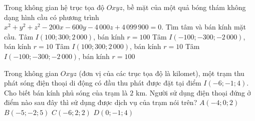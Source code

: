 \begin{ex}%
	Trong không gian hệ trục tọa độ  $Oxyz$, bề mặt của một quả bóng thám không dạng hình cầu có phương trình $x^2+y^2+z^2-200x-600y-4\,000z+4\,099\,900=0$. Tìm tâm và bán kính mặt cầu.
	 \choice
		{Tâm $I\left(100;300;2\,000\right)$, bán  kính $r=100$}
		{Tâm $I\left(-100;-300;-2\,000\right)$, bán  kính $r=10$}
		{\True Tâm $I\left(100;300;2\,000\right)$, bán  kính $r=10$}
		{Tâm $I\left(-100;-300;-2\,000\right)$, bán  kính $r=100$}
\end{ex}

\begin{ex}%
	Trong không gian $Oxyz$ (đơn vị của các trục tọa độ là kilomet), một trạm thu phát sóng điện thoại di động có đầu thu phát được  đặt tại điểm $I\left(-6;-1;4\right)$. Cho biết bán kính phủ sóng của trạm là $2$ km. Người sử dụng điện thoại đứng ở điểm nào sau đây thì sử dụng được dịch vụ của trạm nói trên?
	 \choice
		{$A\left(-4;0;2\right)$} 
		 {\True $B\left(-5;-2;5\right)$}
		 {$C\left(-6;2;2\right)$}
		{$D\left(0;-1;4\right)$} 
\end{ex}

